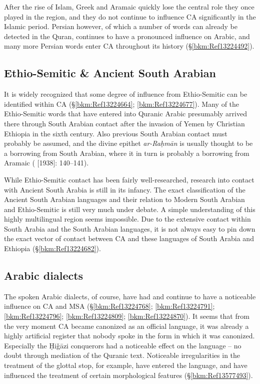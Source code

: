 \documentclass[output=paper]{langsci/langscibook}
\begin{document}
After the rise of Islam, Greek and Aramaic quickly lose the central role they once played in the region, and they do not continue to influence CA significantly in the Islamic period. Persian however, of which a number of words can already be detected in the Quran, continues to have a pronounced influence on Arabic, and many more Persian words enter CA throughout its history (§\ref{bkm:Ref13224492}).

\subsection{Ethio-Semitic \& Ancient South Arabian}

It is widely recognized that some degree of influence from Ethio-Semitic can be identified within CA (§\ref{bkm:Ref13224664}; \ref{bkm:Ref13224677}). Many of the Ethio-Semitic words that have entered into Quranic Arabic presumably arrived there through South Arabian contact after the invasion of Yemen by Christian Ethiopia in the sixth century. Also previous South Arabian contact must probably be assumed, and the divine epithet \textit{ar-Raḥmān} is usually thought to be a borrowing from South Arabian, where it in turn is probably a borrowing from Aramaic (\citealt{Jeffrey2007} [1938]: 140--141). 

While Ethio-Semitic contact has been fairly well-researched, research into contact with Ancient South Arabia is still in its infancy. The exact classification of the Ancient South Arabian languages and their relation to Modern South Arabian and Ethio-Semitic is still very much under debate. A simple understanding of this highly multilingual region seems impossible. Due to the extensive contact within South Arabia and the South Arabian languages, it is not always easy to pin down the exact vector of contact between CA and these languages of South Arabia and Ethiopia (§\ref{bkm:Ref13224682}).

\subsection{\label{bkm:Ref13224768}Arabic dialects}

The spoken Arabic dialects, of course, have had and continue to have a noticeable influence on CA and MSA (§\ref{bkm:Ref13224768}; \ref{bkm:Ref13224791}; \ref{bkm:Ref13224796}; \ref{bkm:Ref13224809}; \ref{bkm:Ref13224870}). It seems that from the very moment CA became canonized as an official language, it was already a highly artificial register that nobody spoke in the form in which it was canonized. Especially the Ḥiǧāzi conquerors had a noticeable effect on the language – no doubt through mediation of the Quranic text. Noticeable irregularities in the treatment of the glottal stop, for example, have entered the language, and have influenced the treatment of certain morphological features (§\ref{bkm:Ref13577493}).
\end{document}
